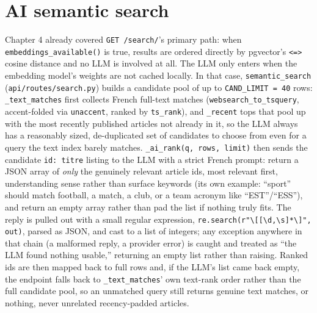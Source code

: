 \section{AI semantic search}
\label{sec:ai-search}
\begin{sloppypar}
Chapter 4 already covered \texttt{GET /search/}'s primary path: when \texttt{embeddings\_available()} is true, results are ordered directly by pgvector's \texttt{<=>} cosine distance and no LLM is involved at all. The LLM only enters when the embedding model's weights are not cached locally. In that case, \texttt{semantic\_search} (\texttt{api/\allowbreak routes/\allowbreak search.py}) builds a candidate pool of up to \texttt{CAND\_LIMIT = 40} rows: \texttt{\_text\_matches} first collects French full-text matches (\texttt{websearch\_to\_tsquery}, accent-folded via \texttt{unaccent}, ranked by \texttt{ts\_rank}), and \texttt{\_recent} tops that pool up with the most recently published articles not already in it, so the LLM always has a reasonably sized, de-duplicated set of candidates to choose from even for a query the text index barely matches. \texttt{\_ai\_rank(q, rows, limit)} then sends the candidate \texttt{id: titre} listing to the LLM with a strict French prompt: return a JSON array of \emph{only} the genuinely relevant article ids, most relevant first, understanding sense rather than surface keywords (its own example: ``sport'' should match football, a match, a club, or a team acronym like ``EST''/``ESS''), and return an empty array rather than pad the list if nothing truly fits. The reply is pulled out with a small regular expression, \texttt{re.search(r"\textbackslash[[\textbackslash d,\textbackslash s]*\textbackslash]", out)}, parsed as JSON, and cast to a list of integers; any exception anywhere in that chain (a malformed reply, a provider error) is caught and treated as ``the LLM found nothing usable,'' returning an empty list rather than raising. Ranked ids are then mapped back to full rows and, if the LLM's list came back empty, the endpoint falls back to \texttt{\_text\_matches}' own text-rank order rather than the full candidate pool, so an unmatched query still returns genuine text matches, or nothing, never unrelated recency-padded articles.
\end{sloppypar}


